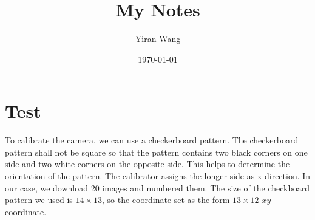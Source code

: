 \documentclass{article}   %
\title{My Notes}
\author{Yiran Wang}
\date{\today}
\begin{document}
\maketitle

\section{Test}
To calibrate the camera, we can use a checkerboard pattern. The checkerboard
pattern shall not be square so that the pattern contains two black corners on
one side and two white corners on the opposite side. This helps to determine
the orientation of the pattern. The calibrator assigns the longer side as
x-direction. In our case, we download 20 images and numbered them. The size of
the checkboard pattern we used is $14\times 13$, so the coordinate set as the
form $13 \times 12$-$x y$ coordinate. 
\end{document}
